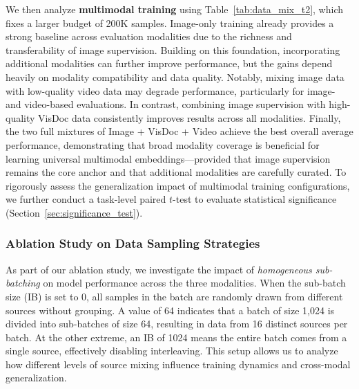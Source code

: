 We then analyze \textbf{multimodal training} using Table~\ref{tab:data_mix_t2}, which fixes a larger budget of 200K samples. Image-only training already provides a strong baseline across evaluation modalities due to the richness and transferability of image supervision. Building on this foundation, incorporating additional modalities can further improve performance, but the gains depend heavily on modality compatibility and data quality. Notably, mixing image data with low-quality video data may degrade performance, particularly for image- and video-based evaluations. In contrast, combining image supervision with high-quality VisDoc data consistently improves results across all modalities. Finally, the two full mixtures of Image + VisDoc + Video achieve the best overall average performance, demonstrating that broad modality coverage is beneficial for learning universal multimodal embeddings---provided that image supervision remains the core anchor and that additional modalities are carefully curated. To rigorously assess the generalization impact of multimodal training configurations, we further conduct a task-level paired $t$-test to evaluate statistical significance (Section~\ref{sec:significance_test}).









\subsubsection{Ablation Study on Data Sampling Strategies}
As part of our ablation study, we investigate the impact of \textit{homogeneous sub-batching} on model performance across the three modalities. When the sub-batch size (IB) is set to 0, all samples in the batch are randomly drawn from different sources without grouping. A value of 64 indicates that a batch of size 1,024 is divided into sub-batches of size 64, resulting in data from 16 distinct sources per batch. At the other extreme, an IB of 1024 means the entire batch comes from a single source, effectively disabling interleaving. This setup allows us to analyze how different levels of source mixing influence training dynamics and cross-modal generalization.

